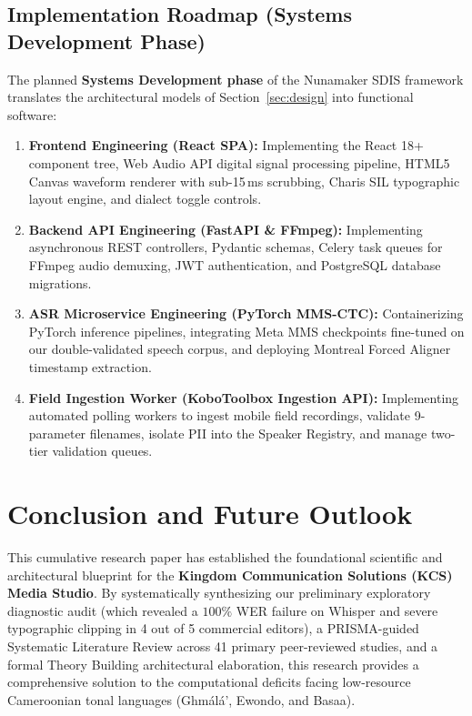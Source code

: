 \documentclass[conference]{IEEEtran}
\begin{document}
\subsection{Implementation Roadmap (Systems Development Phase)}
\label{sec:implementation}

The planned \textbf{Systems Development phase} of the Nunamaker SDIS framework translates the architectural models of Section~\ref{sec:design} into functional software:
\begin{enumerate}
    \item \textbf{Frontend Engineering (React SPA):} Implementing the React 18+ component tree, Web Audio API digital signal processing pipeline, HTML5 Canvas waveform renderer with sub-15\,ms scrubbing, Charis SIL typographic layout engine, and dialect toggle controls.
    \item \textbf{Backend API Engineering (FastAPI \& FFmpeg):} Implementing asynchronous REST controllers, Pydantic schemas, Celery task queues for FFmpeg audio demuxing, JWT authentication, and PostgreSQL database migrations.
    \item \textbf{ASR Microservice Engineering (PyTorch MMS-CTC):} Containerizing PyTorch inference pipelines, integrating Meta MMS checkpoints fine-tuned on our double-validated speech corpus, and deploying Montreal Forced Aligner timestamp extraction.
    \item \textbf{Field Ingestion Worker (KoboToolbox Ingestion API):} Implementing automated polling workers to ingest mobile field recordings, validate 9-parameter filenames, isolate PII into the Speaker Registry, and manage two-tier validation queues.
\end{enumerate}

\section*{Conclusion and Future Outlook}
\label{sec:conclusion}

This cumulative research paper has established the foundational scientific and architectural blueprint for the \textbf{Kingdom Communication Solutions (KCS) Media Studio}. By systematically synthesizing our preliminary exploratory diagnostic audit (which revealed a $100\%$ WER failure on Whisper and severe typographic clipping in 4 out of 5 commercial editors), a PRISMA-guided Systematic Literature Review across 41 primary peer-reviewed studies, and a formal Theory Building architectural elaboration, this research provides a comprehensive solution to the computational deficits facing low-resource Cameroonian tonal languages (Gh\textopeno m\'al\'a', Ewondo, and Basaa).
\end{document}
